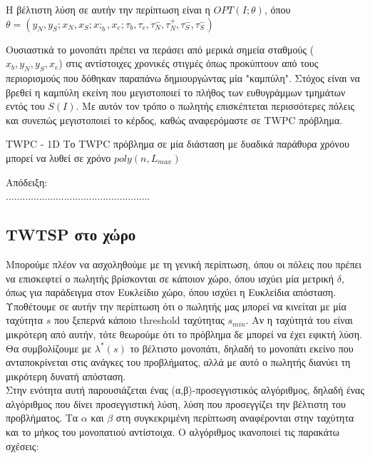 \documentclass[oneside,12pt]{book}
\theoremstyle{definition}
\begin{document}
Η βέλτιστη λύση σε αυτήν την περίπτωση είναι η \(OPT(I;θ)\), όπου \\ \(θ = (y_N, y_S; x_N, x_S; x;_b, x_e; τ_b, τ_e, τ_{N}^{-} ,τ_{N}^{+}, τ_{S}^{-}, τ_{S}^{-})\)

Ουσιαστικά το μονοπάτι πρέπει να περάσει από μερικά σημεία σταθμούς (\(x_b, y_N, y_S, x_e\)) στις αντίστοιχες χρονικές στιγμές όπως προκύπτουν από τους περιορισμούς που δόθηκαν παραπάνω δημιουργώντας μία "καμπύλη". Στόχος είναι να βρεθεί η καμπύλη εκείνη που μεγιστοποιεί το πλήθος των ευθυγράμμων τμημάτων εντός του \(S(I)\). Με αυτόν τον τρόπο ο πωλητής επισκέπτεται περισσότερες πόλεις και συνεπώς μεγιστοποιεί το κέρδος, καθώς αναφερόμαστε σε TWPC πρόβλημα. \\

\begin{mylemma}{TWPC - 1D}{}
	Το TWPC πρόβλημα σε μία διάσταση με δυαδικά παράθυρα χρόνου μπορεί να λυθεί σε χρόνο \(poly(n,L_{max})\)
\end{mylemma}

Απόδειξη: \\
....................................................

\subsection{TWTSP στο χώρο}

Μπορούμε πλέον να ασχοληθούμε με τη γενική περίπτωση, όπου οι πόλεις που πρέπει να επισκεφτεί ο πωλητής βρίσκονται σε κάποιον χώρο, όπου ισχύει μία μετρική \(δ\), όπως για παράδειγμα στον Ευκλείδιο χώρο, όπου ισχύει η Ευκλείδια απόσταση. \\

Υποθέτουμε σε αυτήν την περίπτωση ότι ο πωλητής μας μπορεί να κινείται με μία ταχύτητα \(s\) που ξεπερνά κάποιο threshold ταχύτητας \(s_{min}\). Αν η ταχύτητά του είναι μικρότερη από αυτήν, τότε θεωρούμε ότι το πρόβλημα δε μπορεί να έχει εφικτή λύση. \\

Θα συμβολίζουμε με \(λ^{*}(s)\) το βέλτιστο μονοπάτι, δηλαδή το μονοπάτι εκείνο που ανταποκρίνεται στις ανάγκες του προβλήματος, αλλά με αυτό ο πωλητής διανύει τη μικρότερη δυνατή απόσταση. \\

Στην ενότητα αυτή παρουσιάζεται ένας (α,β)-προσεγγιστικός αλγόριθμος, δηλαδή ένας αλγόριθμος που δίνει προσεγγιστική λύση, λύση που προσεγγίζει την βέλτιστη του προβλήματος. Τα \(α\) και \(β\) στη συγκεκριμένη περίπτωση αναφέρονται στην ταχύτητα και το μήκος του μονοπατιού αντίστοιχα. Ο αλγόριθμος ικανοποιεί τις παρακάτω σχέσεις:
\end{document}
